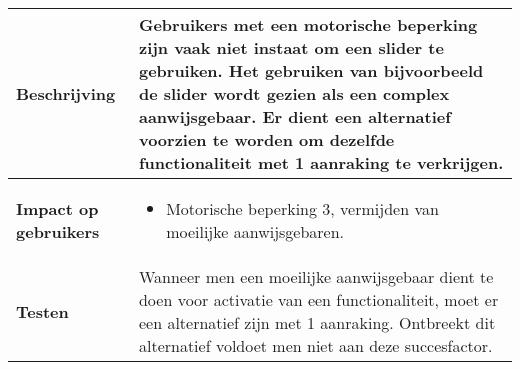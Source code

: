 \begin{table}[H]
\begin{tabular}{|l|p{12cm}|}
        \hline
        \textbf{Beschrijving}                 & Gebruikers met een motorische beperking zijn vaak niet instaat om een slider te gebruiken. Het gebruiken van bijvoorbeeld de slider wordt gezien als een complex aanwijsgebaar. Er dient een alternatief voorzien te worden om dezelfde functionaliteit met 1 aanraking te verkrijgen.\\ 
        \hline
        \textbf{Impact op gebruikers}         &  
        \begin{itemize}
            \item Motorische beperking 3, vermijden van moeilijke aanwijsgebaren.
  
            
        \end{itemize}                                                                                                                                                                                                                                                                                                                                                                                                                    \\ 
       
        \hline
        \textbf{Testen}                       & Wanneer men een moeilijke aanwijsgebaar dient te doen voor activatie van een functionaliteit, moet er een alternatief zijn met 1 aanraking. Ontbreekt dit alternatief voldoet men niet aan deze succesfactor.                                                                                                                        \\
        \hline
    \end{tabular}
    
\end{table}

